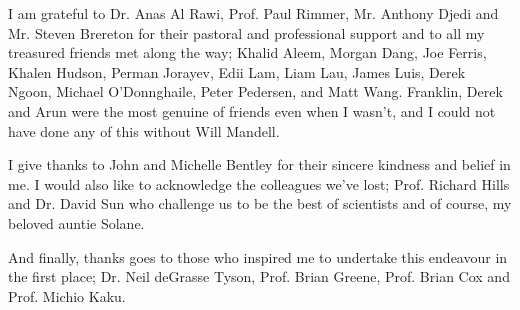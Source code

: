 \begin{acknowledgements}
I am grateful to Dr. Anas Al Rawi, Prof. Paul Rimmer, Mr. Anthony Djedi and Mr. Steven Brereton for their pastoral and professional support and to all my treasured friends met along the way; Khalid Aleem, Morgan Dang, Joe Ferris, Khalen Hudson, Perman Jorayev, Edii Lam, Liam Lau, James Luis, Derek Ngoon, Michael O'Donnghaile, Peter Pedersen, and Matt Wang. Franklin, Derek and Arun were the most genuine of friends even when I wasn’t, and I could not have done any of this without Will Mandell.

I give thanks to John and Michelle Bentley for their sincere kindness and belief in me. I would also like to acknowledge the colleagues we’ve lost; Prof. Richard Hills and Dr. David Sun who challenge us to be the best of scientists and of course, my beloved auntie Solane.

And finally, thanks goes to those who inspired me to undertake this endeavour in the first place; Dr. Neil deGrasse Tyson, Prof. Brian Greene, Prof. Brian Cox and Prof. Michio Kaku.

\end{acknowledgements}
